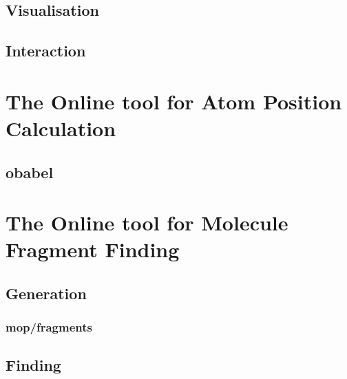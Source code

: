 \subsection{Visualisation}
\nlipsum

\subsection{Interaction}
\nlipsum


\section[OAPoC]{The Online tool for Atom Position Calculation}
\nlipsum

\subsection{obabel}
\nlipsum


\section[OMFraF]{The Online tool for Molecule Fragment Finding}
\nlipsum

\subsection{Generation}
\nlipsum

\subsubsection{mop/fragments}
\nlipsum

\subsection{Finding}
\nlipsum
